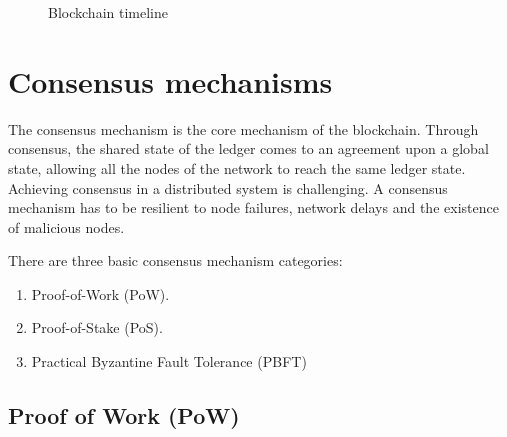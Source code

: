 \begin{figure}[ht!]
  \caption{Blockchain timeline}
  \label{fig:blockchain_timeline}
\end{figure}

\section{Consensus mechanisms}\label{blockchain:consensus_mechanisms}

The consensus mechanism is the core mechanism of the blockchain. Through consensus, the shared state of the ledger comes to an agreement upon a global state,
allowing all the nodes of the network to reach the same ledger state. Achieving consensus in a distributed system is challenging.
A consensus mechanism has to be resilient to node failures, network delays and the existence of malicious nodes.

There are three basic consensus mechanism categories:

\begin{enumerate}
  \item Proof-of-Work (PoW).
  \item Proof-of-Stake (PoS).
  \item Practical Byzantine Fault Tolerance (PBFT)
\end{enumerate}


\subsection{Proof of Work (PoW)}\label{blockchain:consensus:pow}

